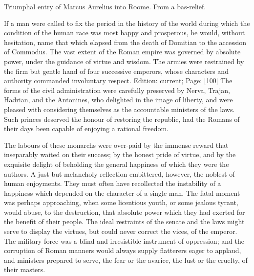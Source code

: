 Triumphal entry of Marcus Aurelius into Roome. From a bas-relief.

If a man were called to fix the period in the history of the world during which the condition of the human race was most happy and prosperous, he would, without hesitation, name that which elapsed from the death of Domitian to the accession of Commodus. The vast extent of the Roman empire was governed by absolute power, under the guidance of virtue and wisdom. The armies were restrained by the firm but gentle hand of four successive emperors, whose characters and authority commanded involuntary respect. Edition: current; Page: [100] The forms of the civil administration were carefully preserved by Nerva, Trajan, Hadrian, and the Antonines, who delighted in the image of liberty, and were pleased with considering themselves as the accountable ministers of the laws. Such princes deserved the honour of restoring the republic, had the Romans of their days been capable of enjoying a rational freedom.

The labours of these monarchs were over-paid by the immense reward that inseparably waited on their success; by the honest pride of virtue, and by the exquisite delight of beholding the general happiness of which they were the authors. A just but melancholy reflection embittered, however, the noblest of human enjoyments. They must often have recollected the instability of a happiness which depended on the character of a single man. The fatal moment was perhaps approaching, when some licentious youth, or some jealous tyrant, would abuse, to the destruction, that absolute power which they had exerted for the benefit of their people. The ideal restraints of the senate and the laws might serve to display the virtues, but could never correct the vices, of the emperor. The military force was a blind and irresistible instrument of oppression; and the corruption of Roman manners would always supply flatterers eager to applaud, and ministers prepared to serve, the fear or the avarice, the lust or the cruelty, of their masters.

